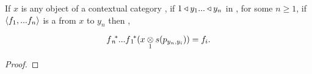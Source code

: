 \begin{lemma}
If $x$ is any object of a contextual category \catcw, if $1 \base y_1 ... \base y_n$ in \catc, for some $n \ge 1$, 
if $\tuple{\fn}$ is a  from $x$ to $y_n$ then \foreachi,

\begin{equation}
\fnvectorstar(\crossx{x}{s(p_{y_n,y_i})}{1})=f_i.                                    
\end{equation}
\end{lemma}

\begin{proof}

\end{proof}
